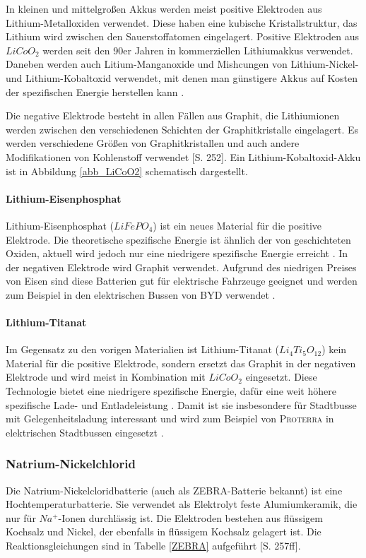 In kleinen und mittelgroßen Akkus werden meist positive Elektroden aus Lithium-Metalloxiden verwendet. Diese haben eine kubische Kristallstruktur, das Lithium wird zwischen den Sauerstoffatomen eingelagert. Positive Elektroden aus $LiCoO_2$ werden seit den 90er Jahren in kommerziellen Lithiumakkus verwendet. Daneben werden auch Litium-Manganoxide und Mishcungen von Lithium-Nickel- und Lithium-Kobaltoxid verwendet, mit denen man günstigere Akkus auf Kosten der spezifischen Energie herstellen kann \cite{whittingham2004lithium}. %

Die negative Elektrode besteht in allen Fällen aus Graphit, die Lithiumionen werden zwischen den verschiedenen Schichten der Graphitkristalle eingelagert. Es werden verschiedene Größen von Graphitkristallen und auch andere Modifikationen von Kohlenstoff verwendet \cite{Sterner:2014}[S. 252]. Ein Lithium-Kobaltoxid-Akku ist in Abbildung \ref{abb_LiCoO2} schematisch dargestellt.

\paragraph{Lithium-Eisenphosphat}
Lithium-Eisenphosphat ($LiFePO_4$) ist ein neues Material für die positive Elektrode. Die theoretische spezifische Energie ist ähnlich der von geschichteten Oxiden, aktuell wird jedoch nur eine niedrigere spezifische Energie erreicht \cite{Tie201382}. In der negativen Elektrode wird Graphit verwendet. Aufgrund des niedrigen Preises von Eisen sind diese Batterien gut für elektrische Fahrzeuge geeignet und werden zum Beispiel in den elektrischen Bussen von \textsc{BYD} verwendet \cite{bydSpecs}.

\paragraph{Lithium-Titanat}
Im Gegensatz zu den vorigen Materialien ist Lithium-Titanat ($Li_4Ti_5O_{12}$) kein Material für die positive Elektrode, sondern ersetzt das Graphit in der negativen Elektrode und wird meist in Kombination mit $LiCoO_2$ eingesetzt. Diese Technologie bietet eine niedrigere spezifische Energie, dafür eine weit höhere spezifische Lade- und Entladeleistung \cite{veneri2012charging}. Damit ist sie insbesondere für Stadtbusse mit Gelegenheitsladung interessant und wird zum Beispiel von \textsc{Proterra} in elektrischen Stadtbussen eingesetzt \cite{protCat}.

\subsubsection{Natrium-Nickelchlorid}
Die Natrium-Nickelcloridbatterie (auch als ZEBRA-Batterie bekannt) ist eine Hochtemperaturbatterie. Sie verwendet als Elektrolyt feste Alumiumkeramik, die nur für $Na^+$-Ionen durchlässig ist. Die Elektroden bestehen aus flüssigem Kochsalz und Nickel, der ebenfalls in flüssigem Kochsalz gelagert ist. Die Reaktionsgleichungen sind in Tabelle \ref{ZEBRA} aufgeführt \cite{KiehneBattery}[S. 257ff].

